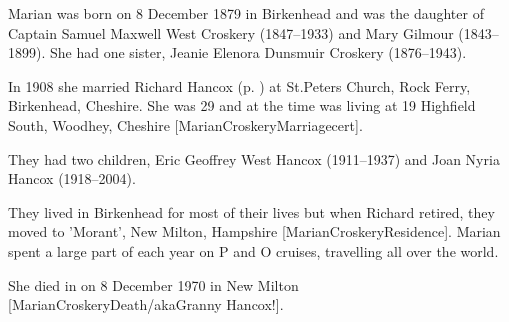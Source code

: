 
Marian was born on 8 December 1879 in  Birkenhead and was the daughter of   Captain Samuel Maxwell West Croskery (1847--1933) and Mary Gilmour (1843--1899). She had one sister, Jeanie Elenora Dunsmuir Croskery (1876--1943).

In 1908 she married Richard Hancox (p. \pageref{Richard_James_Hancox}) at St.Peters Church, Rock Ferry, Birkenhead, Cheshire. She was 29 and at the time was living at 19 Highfield South, Woodhey, Cheshire [MarianCroskeryMarriagecert].

They had two children, Eric Geoffrey West Hancox (1911--1937) and Joan Nyria Hancox (1918--2004).

They lived in Birkenhead for most of their lives but when Richard retired, they moved to  'Morant', New Milton, Hampshire [MarianCroskeryResidence].  Marian spent a large part of each year on P and O cruises, travelling all over the world.

She died in on 8 December 1970 in New Milton [MarianCroskeryDeath/akaGranny Hancox!].
